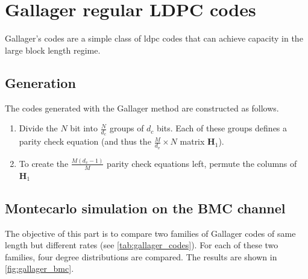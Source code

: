 \section{Gallager regular LDPC codes} \label{sec:gallager_codes}

Gallager's codes are a simple class of \acrshort{ldpc} codes that can achieve
capacity in the large block length regime.

\subsection{Generation}

The codes generated with the Gallager method are constructed as follows.
\begin{enumerate}
    \item Divide the $N$ bit into $\frac{N}{d_c}$ groups of $d_c$ bits. Each of
          these groups defines a parity check equation (and thus the
          $\frac{M}{d_v} \times N$ matrix $\bm{H}_1$).
    \item To create the $\frac{M (d_v -1)}{M}$ parity check equations left,
          permute the columns of $\bm{H}_1$
\end{enumerate}


\subsection{Montecarlo simulation on the BMC channel}

The objective of this part is to compare two families of Gallager codes of same
length but different rates (see \autoref{tab:gallager_codes}). For each of these
two families, four degree distributions are compared. The results are shown in
\autoref{fig:gallager_bmc}.

